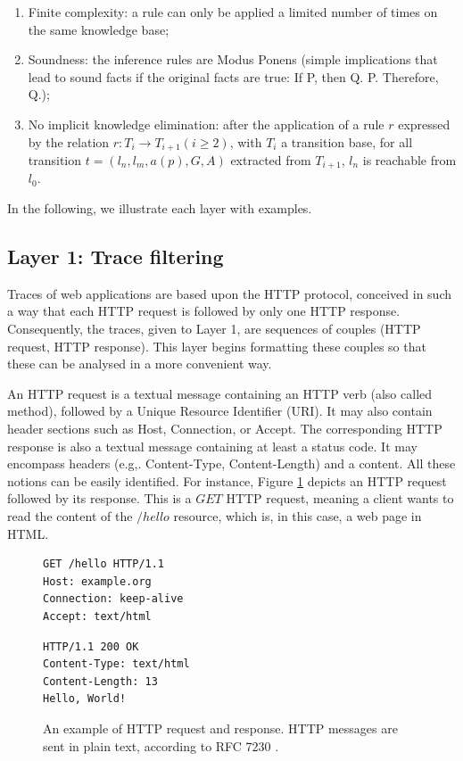 \begin{enumerate}
\item Finite complexity: a rule can only be applied a limited
number of times on the same knowledge base;

\item Soundness: the inference rules are Modus Ponens (simple
implications that lead to sound facts if the original facts are
true: If P, then Q. P. Therefore, Q.);

\item No implicit knowledge elimination: after the application
of a rule $r$ expressed by the relation $r: T_i \rightarrow
T_{i+1} (i\geq 2)$, with $T_i$ a transition base, for all
transition $t=(l_n,l_m,a(p),G,A)$ extracted from $T_{i+1}$, $l_n$
is reachable from $l_0$.
\end{enumerate}

In the following, we illustrate each layer with examples.

\subsection{Layer 1: Trace filtering}
\label{sec:modelinf:webapps:L1}

Traces of web applications are based upon the HTTP protocol,
conceived in such a way that each HTTP request is followed by
only one HTTP response. Consequently, the traces, given to Layer
1, are sequences of couples (HTTP request, HTTP response). This
layer begins formatting these couples so that these can be
analysed in a more convenient way.

An HTTP request is a textual message containing an HTTP verb
(also called method), followed by a Unique Resource Identifier
(URI). It may also contain header sections such as Host,
Connection, or Accept. The corresponding HTTP response is also a
textual message containing at least a status code. It may
encompass headers (e.g,.  Content-Type, Content-Length) and a
content. All these notions can be easily identified. For
instance, Figure \ref{fig:httpexample} depicts an HTTP request
followed by its response. This is a $GET$ HTTP request, meaning a
client wants to read the content of the $/hello$ resource, which
is, in this case, a web page in HTML.

\begin{figure}[ht]
\begin{framed}
\begin{BVerbatim}
GET /hello HTTP/1.1
Host: example.org
Connection: keep-alive
Accept: text/html
\end{BVerbatim}
\end{framed}

\begin{framed}
\begin{BVerbatim}
HTTP/1.1 200 OK
Content-Type: text/html
Content-Length: 13
Hello, World!
\end{BVerbatim}
\end{framed}

    \caption{An example of HTTP request and response. HTTP messages
    are sent in plain text, according to RFC 7230 \cite{RFC7230}.}
    \label{fig:httpexample}
\end{figure}


